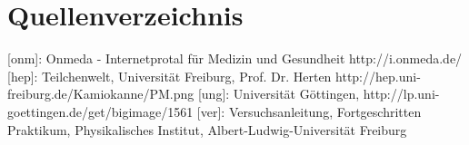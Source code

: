 \section{Quellenverzeichnis}

[onm]: Onmeda - Internetprotal für Medizin und Gesundheit http://i.onmeda.de/
[hep]: Teilchenwelt, Universität Freiburg, Prof. Dr. Herten http://hep.uni-freiburg.de/Kamiokanne/PM.png
[ung]: Universität Göttingen, http://lp.uni-goettingen.de/get/bigimage/1561
[ver]: Versuchsanleitung, Fortgeschritten Praktikum, Physikalisches Institut, Albert-Ludwig-Universität Freiburg